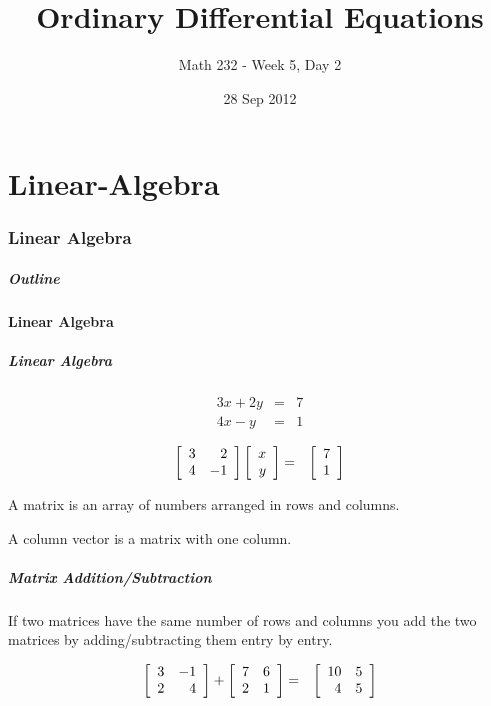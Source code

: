 \part{Linear-Algebra}
\section{Linear Algebra}

\title{Ordinary Differential Equations}
\subtitle{Math 232 - Week 5, Day 2}
\date{28 Sep 2012}

\begin{frame}
  \titlepage
\end{frame}

\begin{frame}
  \frametitle{Outline}
\end{frame}


\subsection{Linear Algebra}


\begin{frame}
  \frametitle{Linear Algebra}


  \begin{eqnarray*}
    3x + 2y & = & 7 \\
    4x - y & = & 1
  \end{eqnarray*}

  {
    \begin{eqnarray*}
      \left[ \begin{array}{rr} 3 & 2 \\ 4 & -1 \end{array} \right] \left[ \begin{array}{r} x \\ y \end{array} \right] & = & \left[ \begin{array}{r} 7 \\ 1 \end{array} \right]
    \end{eqnarray*}

    A matrix is an array of numbers arranged in rows and columns.

    A column vector is a matrix with one column.

  }


\end{frame}


\begin{frame}
  \frametitle{Matrix Addition/Subtraction}

  If two matrices have the same number of rows and columns you add the
  two matrices by adding/subtracting them entry by entry.

  \begin{eqnarray*}
    \left[ \begin{array}{rr} 3 & -1 \\ 2 & 4 \end{array} \right] + \left[ \begin{array}{rr} 7 & 6 \\ 2 & 1 \end{array} \right] & = & \left[ \begin{array}{rr} 10 & 5 \\ 4 & 5 \end{array} \right]
  \end{eqnarray*}

\end{frame}


